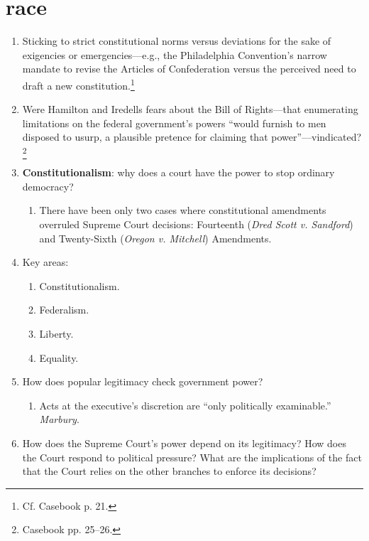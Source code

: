 \section{race}

\begin{enumerate}
    \item Sticking to strict constitutional norms versus deviations for the 
    sake of exigencies or emergencies---e.g., the Philadelphia Convention's 
    narrow mandate to revise the Articles of Confederation versus the 
    perceived need to draft a new constitution.\footnote{Cf. Casebook p. 21.}
    \item Were Hamilton and Iredells fears about the Bill of Rights---that 
    enumerating limitations on the federal government's powers ``would furnish 
    to men disposed to usurp, a plausible pretence for claiming that 
    power''---vindicated?\footnote{Casebook pp. 25--26.}
    \item \textbf{Constitutionalism}: why does a court have the power to stop 
    ordinary democracy?
    \begin{enumerate}
        \item There have been only two cases where constitutional amendments 
        overruled Supreme Court decisions: Fourteenth (\emph{Dred Scott v. 
        Sandford}) and Twenty-Sixth (\emph{Oregon v. Mitchell}) Amendments.
    \end{enumerate}
    \item Key areas:
    \begin{enumerate}
        \item Constitutionalism.
        \item Federalism.
        \item Liberty.
        \item Equality.
    \end{enumerate}
    \item How does popular legitimacy check government power?
    \begin{enumerate}
        \item Acts at the executive's discretion are ``only politically 
        examinable.'' \emph{Marbury}.
    \end{enumerate}
    \item How does the Supreme Court's power depend on its legitimacy? How 
    does the Court respond to political pressure? What are the implications of 
    the fact that the Court relies on the other branches to enforce its 
    decisions?
    \begin{enumerate}

\end{enumerate}
\end{enumerate}

